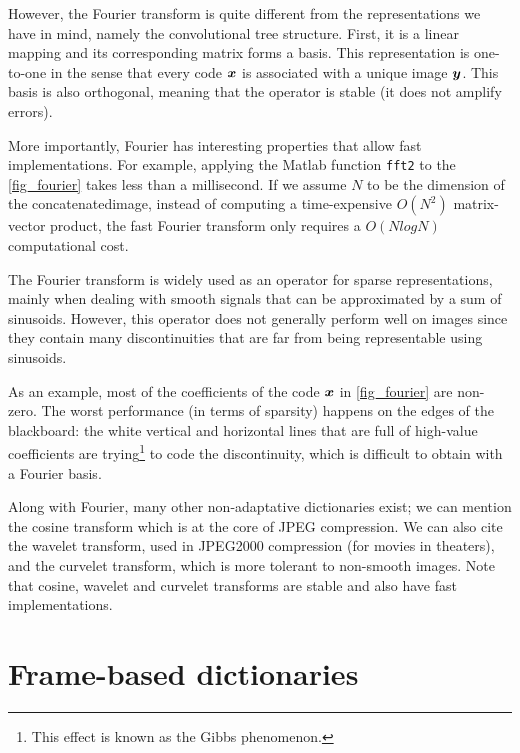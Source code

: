 However, the Fourier transform is quite different from the representations we have in mind, namely the convolutional tree structure. First, it is a linear mapping and its corresponding matrix forms a basis. This representation is one-to-one in the sense that every code $\bm{x}$ is associated with a unique image $\bm{y}$. This basis is also orthogonal, meaning that the operator is stable (it does not amplify errors). %

More importantly, Fourier has interesting properties that allow fast implementations. For example, applying the Matlab function \texttt{fft2} to the \cref{fig_fourier} takes less than a millisecond. If we assume $N$ to be the dimension of the concatenated\footnotemark[2] image, instead of computing a time-expensive $O(N^2)$ matrix-vector product, the fast Fourier transform only requires a $O(NlogN)$ computational cost.



The Fourier transform is widely used as an operator for sparse representations, mainly when dealing with smooth signals that can be approximated by a sum of sinusoids. However, this operator does not generally perform well on images since they contain many discontinuities that are far from being representable using sinusoids.

As an example, most of the coefficients of the code $\bm{x}$ in \cref{fig_fourier} are non-zero. The worst performance (in terms of sparsity) happens on the edges of the blackboard: the white vertical and horizontal lines that are full of high-value coefficients are trying\footnote{This effect is known as the Gibbs phenomenon.} to code the discontinuity, which is difficult to obtain with a Fourier basis.

Along with Fourier, many other non-adaptative dictionaries exist; we can mention the cosine transform which is at the core of JPEG compression. We can also cite the wavelet transform, used in JPEG2000 compression (for movies in theaters), and the curvelet transform, which is more tolerant to non-smooth images. Note that cosine, wavelet and curvelet transforms are stable and also have fast implementations.


\section{Frame-based dictionaries}

